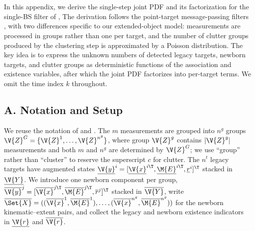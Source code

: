 
\section{}
\label{sec:appendix_I}

In this appendix, we derive the single-step joint \ac{PDF} and its factorization for the single-\ac{BS} filter of ,  The derivation follows the point-target message-passing filters \cite{meyer2018messagepassing,meyer2018messagepassingSupplement,meyer2021scalable}, with two differences specific to our extended-object model: measurements are processed in groups rather than one per target, and the number of clutter groups produced by the clustering step is approximated by a Poisson distribution. The key idea is to express the unknown numbers of detected legacy targets, newborn targets, and clutter groups as deterministic functions of the association and existence variables, after which the joint \ac{PDF} factorizes into per-target terms. We omit the time index \(k\) throughout.

\newcommand{\Pm}[2]{{}_{#1}P_{#2}}  %
\newcommand{\mucgroup}{\mu_{g}}

\subsection*{A. Notation and Setup}

We reuse the notation of  and . The \(m\) measurements are grouped into \(n^g\) groups \(\V{Z}^{G}=\{\V{Z}^1,\dots,\V{Z}^{n^g}\}\), where group \(\V{Z}^g\) contains \(|\V{Z}^g|\) measurements and both \(m\) and \(n^g\) are determined by \(\V{Z}^{G}\); we use ``group'' rather than ``cluster'' to reserve the superscript \(c\) for clutter. The \(n^t\) legacy targets have augmented states \(\underline{\V{y}}^i=[\underline{\V{x}}^{i\T},\underline{\M{E}}^{i\T},\underline{r}^i]^\T\) stacked in \(\underline{\V{Y}}\). We introduce one newborn component per group, \(\overline{\V{y}}^j=[\overline{\V{x}}^{j\T},\overline{\M{E}}^{j\T},\overline{r}^j]^\T\) stacked in \(\overline{\V{Y}}\), write \(\overline{\Set{X}}=((\overline{\V{x}}^1,\overline{\M{E}}^1),\dots,(\overline{\V{x}}^{n^g},\overline{\M{E}}^{n^g}))\) for the newborn kinematic--extent pairs, and collect the legacy and newborn existence indicators in \(\underline{\V{r}}\) and \(\overline{\V{r}}\).

